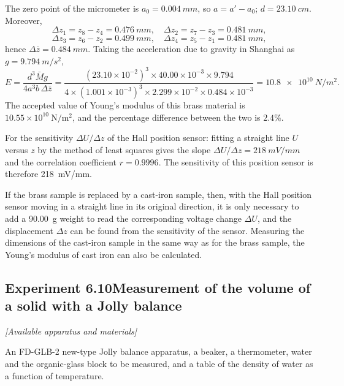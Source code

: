 \noindent The zero point of the micrometer is $a_0=\SI{0.004}{mm}$, so $a=a'-a_0$; $d=\SI{23.10}{cm}$. Moreover,
\begin{equation*}
\Delta z_1=z_8-z_4=\SI{0.476}{mm},\quad
\Delta z_2=z_7-z_3=\SI{0.481}{mm},
\end{equation*}
\begin{equation*}
\Delta z_3=z_6-z_2=\SI{0.499}{mm},\quad
\Delta z_4=z_5-z_1=\SI{0.481}{mm},
\end{equation*}
hence $\Delta\bar z=\SI{0.484}{mm}$. Taking the acceleration due to gravity in Shanghai as $g=\SI{9.794}{m/s^2}$,
\begin{equation*}
E=\frac{d^{3}\bar M g}{4a^{3}b\,\Delta\bar z}
=\frac{(23.10\times10^{-2})^{3}\times40.00\times10^{-3}\times9.794}
{4\times(1.001\times10^{-3})^{3}\times2.299\times10^{-2}\times0.484\times10^{-3}}
=\SI{10.8e10}{N/m^2}.
\end{equation*}
The accepted value of Young's modulus of this brass material is $10.55\times10^{10}\ \mathrm{N/m^2}$, and the percentage difference between the two is $2.4\%$.

For the sensitivity $\Delta U/\Delta z$ of the Hall position sensor: fitting a straight line $U$ versus $z$ by the method of least squares gives the slope $\Delta U/\Delta z=\SI{218}{mV/mm}$ and the correlation coefficient $r=0.9996$. The sensitivity of this position sensor is therefore \SI{218}{mV/mm}.

If the brass sample is replaced by a cast-iron sample, then, with the Hall position sensor moving in a straight line in its original direction, it is only necessary to add a \SI{90.00}{g} weight to read the corresponding voltage change $\Delta U$, and the displacement $\Delta z$ can be found from the sensitivity of the sensor. Measuring the dimensions of the cast-iron sample in the same way as for the brass sample, the Young's modulus of cast iron can also be calculated.

\subsection*{Experiment 6.10\quad Measurement of the volume of a solid with a Jolly balance}

\noindent\textit{[Available apparatus and materials]}

An FD-GLB-2 new-type Jolly balance apparatus, a beaker, a thermometer, water and the organic-glass block to be measured, and a table of the density of water as a function of temperature.

